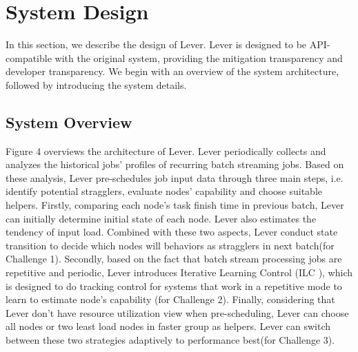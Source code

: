 \section{System Design}

  In this section, we describe the design of Lever. Lever is designed to be API-compatible with the original system, providing the mitigation transparency and developer transparency. We begin with an overview of the system architecture, followed by introducing the system details.

\subsection{System Overview}

  Figure 4 overviews the architecture of Lever. Lever periodically collects and analyzes the historical jobs' profiles of recurring batch streaming jobs. Based on these analysis, Lever pre-schedules job input data through three main steps, i.e. identify potential stragglers, evaluate nodes' capability and choose suitable helpers. Firstly, comparing each node's task finish time in previous batch, Lever can initially determine initial state of each node. Lever also estimates the tendency of input load. Combined with these two aspects, Lever conduct state transition to decide which nodes will behaviors as stragglers in next batch(for Challenge 1). Secondly, based on the fact that batch stream processing jobs are repetitive and periodic, Lever introduces Iterative Learning Control (ILC \cite{Arimoto}), which is designed to do tracking control for systems that work in a repetitive mode to learn to estimate node's capability (for Challenge 2). Finally, considering that Lever don't have resource utilization view when pre-scheduling, Lever can choose all nodes or two least load nodes in faster group as helpers. Lever can switch between these two strategies adaptively to performance best(for Challenge 3).

